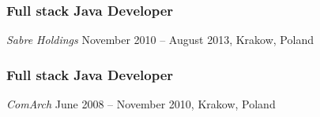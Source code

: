 \documentclass[]{rss}
\begin{document}
\begin{resume}
\hypertarget{full-stack-java-developer}{%
\subsubsection{Full stack Java
Developer}\label{full-stack-java-developer}}

\emph{Sabre Holdings} November 2010 -- August 2013, Krakow, Poland

\hypertarget{full-stack-java-developer-1}{%
\subsubsection{Full stack Java
Developer}\label{full-stack-java-developer-1}}

\emph{ComArch} June 2008 -- November 2010, Krakow, Poland

\end{resume}
\end{document}

